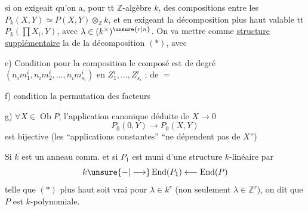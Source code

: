 
si on exigeait qu'on a, pour tt $\mathbb Z$-algèbre $k$,
des compositions entre les $P_k(X,Y)\simeq P(X,Y)\otimes_{\mathbb Z}k$,
et en exigeant la décomposition plus haut
valable  tt $P_k(\prod X_i,Y)$, avec $\lambda\in(k^\times)^{\unsure{r|n}}$. On
va mettre comme \uline{structure supplémentaire}
la  de la décomposition $(*)$, avec

e) Condition  pour la composition
le composé est de degré $(n_i m^i_1,n_i m^i_2,\ldots,n_i m^i_{s_i})$
en $Z^i_1,\ldots,Z^i_{s_i}$ ; de $=$

f) condition   la permutation des facteurs

g) $\forall X\in\operatorname{Ob}P$, l'application canonique déduite de
$X\longrightarrow0$
\[
P_0(0,Y)\longrightarrow P_0(X,Y)
\]
est bijective (les ``applications constantes'' 
``ne dépendent pas de $X$'')

Si $k$ est un anneau comm. et si $P_1$ est muni
d'une structure $k$-linéaire par
\[
k\unsure{-|\longrightarrow}\operatorname{End}(P_1)\longleftarrow\operatorname{End}(P)
\]
telle que $(*)$ plus haut soit vrai pour
$\lambda\in k^r$ (non seulement $\lambda\in\mathbb Z^r$), on dit que
$P$ est $k$-polynomiale.

